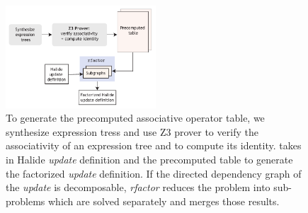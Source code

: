 \begin{figure}
\centering
\includegraphics[width=0.5\textwidth]{system}
\caption{To generate the precomputed associative operator table, we synthesize expression tress and use Z3 prover to verify the associativity of an expression tree and to compute its identity.  takes in Halide \emph{update} definition and the precomputed table to generate the factorized \emph{update} definition. If the directed dependency graph of the \emph{update} is decomposable, \emph{rfactor} reduces the problem into sub-problems which are solved separately and merges those results.}
\label{fig:system} 
\end{figure}
